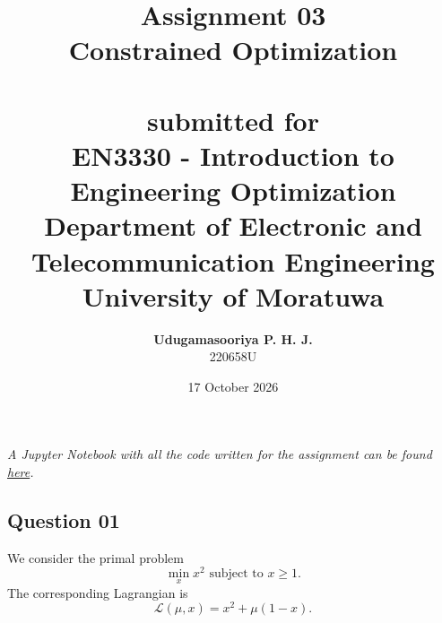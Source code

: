 \documentclass{article}[a4paper]
\title{
	\huge{\textbf{
		Assignment 03
	}}\\
	\Large{
		Constrained Optimization
	}\\
	\large{\phantom{}}\\
	\large{
		submitted for
	}\\
	\Large{
		\textbf{EN3330 - Introduction to Engineering Optimization}
	}\\
	\large{
		Department of Electronic and Telecommunication Engineering
	}
	\\
	\large{University of Moratuwa}
}
\author{
	\textbf{Udugamasooriya P. H. J.}\\
	220658U
}
\date{17 October 2026}
\begin{document}
	\maketitle

    \textit{A Jupyter Notebook with all the code written for the assignment can be found \href{https://google.com}{here}.}

    \subsection*{Question 01}

    We consider the primal problem \[
        \min_{x} x^2 \text{ subject to } x \geq 1.
    \] The corresponding Lagrangian is \[
        \mathcal{L} \left( \mu, x \right)
        =
        x^2 + \mu \left( 1 - x \right).
    \]
\end{document}
